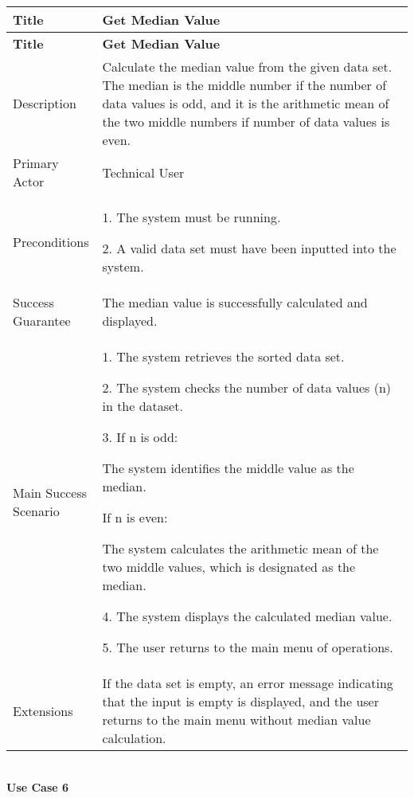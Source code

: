     \begin{longtable}{|p{0.227\linewidth}|p{0.773\linewidth}|}
    \hline
    \textbf{Title} & \textbf{Get Median Value} \\
    \hline
    \endfirsthead
    \hline
    \textbf{Title} & \textbf{Get Median Value} \\
    \hline
    \endhead
    \hline
    \endfoot
    \hline
    \endlastfoot
    Description & Calculate the median value from the given data set. The
    median is the middle number if the number of data values is odd, and it
    is the arithmetic mean of the two middle numbers if number of data
    values is even. \\ \hline
    Primary Actor & Technical User \\ \hline
    Preconditions & 1. The system must be running.
    
    2. A valid data set must have been inputted into the system. \\ \hline
    Success Guarantee & The median value is successfully calculated and
    displayed. \\ \hline
    Main Success Scenario & 1. The system retrieves the sorted data set.
    
    2. The system checks the number of data values (n) in the dataset.
    
    3. If n is odd:
    
    The system identifies the middle value as the median.
    
    If n is even:
    
    The system calculates the arithmetic mean of the two middle values,
    which is designated as the median.
    
    4. The system displays the calculated median value.
    
    5. The user returns to the main menu of operations. \\ \hline
    Extensions & If the data set is empty, an error message indicating that
    the input is empty is displayed, and the user returns to the main menu
    without median value calculation.
    \end{longtable}
    
    \pagebreak

    \strut \\
    \textbf{\large Use Case 6}
    
